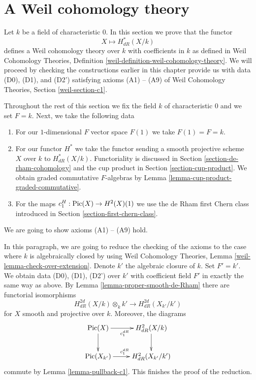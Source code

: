 \section{A Weil cohomology theory}
\label{section-weil}

\noindent
Let $k$ be a field of characteristic $0$. In this section we prove that
the functor
$$
X \longmapsto H^*_{dR}(X/k)
$$
defines a Weil cohomology theory over $k$ with coefficients in $k$ as defined
in Weil Cohomology Theories, Definition
\ref{weil-definition-weil-cohomology-theory}.
We will proceed by checking the constructions earlier in this
chapter provide us with data (D0), (D1), and (D2') satisfying
axioms (A1) -- (A9) of
Weil Cohomology Theories, Section \ref{weil-section-c1}.

\medskip\noindent
Throughout the rest of this section we fix the field $k$ of characteristic
$0$ and we set $F = k$. Next, we take the following data
\begin{enumerate}
\item[(D0)] For our $1$-dimensional $F$ vector space $F(1)$ we take
$F(1) = F = k$.
\item[(D1)] For our functor $H^*$ we take the functor sending
a smooth projective scheme $X$ over $k$ to $H^*_{dR}(X/k)$.
Functoriality is discussed in Section \ref{section-de-rham-cohomology}
and the cup product in Section \ref{section-cup-product}.
We obtain graded commutative $F$-algebras by
Lemma \ref{lemma-cup-product-graded-commutative}.
\item[(D2')] For the maps $c_1^H : \mathop{\mathrm{Pic}}\nolimits(X) \to H^2(X)(1)$ we
use the de Rham first Chern class introduced in
Section \ref{section-first-chern-class}.
\end{enumerate}
We are going to show axioms (A1) -- (A9) hold.

\medskip\noindent
In this paragraph, we are going to reduce the checking of the
axioms to the case where $k$ is algebraically closed by
using Weil Cohomology Theories, Lemma \ref{weil-lemma-check-over-extension}.
Denote $k'$ the algebraic closure of $k$.
Set $F' = k'$. We obtain data (D0), (D1), (D2') over $k'$ with
coefficient field $F'$ in exactly the same way as above.
By Lemma \ref{lemma-proper-smooth-de-Rham} there are
functorial isomorphisms
$$
H_{dR}^{2d}(X/k) \otimes_k k'
\longrightarrow
H_{dR}^{2d}(X_{k'}/k')
$$
for $X$ smooth and projective over $k$. Moreover, the diagrams
$$
\xymatrix{
\Pic(X) \ar[r]_{c^{dR}_1} \ar[d] & H_{dR}^2(X/k) \ar[d] \\
\Pic(X_{k'}) \ar[r]^{c^{dR}_1} & H_{dR}^2(X_{k'}/k')
}
$$
commute by Lemma \ref{lemma-pullback-c1}.
This finishes the proof of the reduction.

